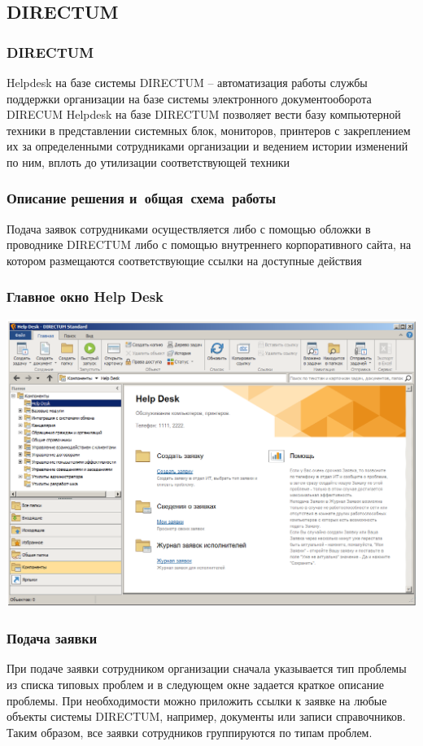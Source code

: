\documentclass{../industrial-development}
\begin{document}
\subsection{DIRECTUM}
\begin{frame} \frametitle{DIRECTUM}

    Helpdesk на базе системы DIRECTUM – автоматизация работы службы поддержки организации на базе системы электронного документооборота DIRECUM
    \newline
    \newline
    Helpdesk на базе DIRECTUM позволяет вести базу компьютерной техники в представлении системных блок, мониторов, принтеров с закреплением их за определенными сотрудниками организации и ведением истории изменений по ним, вплоть до утилизации соответствующей техники

\end{frame}
\lecturenotes

\begin{frame} \frametitle{Описание решения и~общая~схема~работы}
Подача заявок сотрудниками осуществляется либо с помощью обложки в проводнике DIRECTUM либо с помощью внутреннего корпоративного сайта, на котором размещаются соответствующие ссылки на доступные действия
\end{frame}
\lecturenotes

\begin{frame} \frametitle{Главное окно Help Desk}
\centerline{\includegraphics[width=\textwidth]{pic1.png}}
\end{frame}
\lecturenotes

\begin{frame} \frametitle{Подача заявки}
При подаче заявки сотрудником организации сначала указывается тип проблемы из списка типовых проблем и в следующем окне задается краткое описание проблемы. 
При необходимости можно приложить ссылки к заявке на любые объекты системы DIRECTUM, например, документы или записи справочников. Таким образом, все заявки сотрудников группируются по типам проблем.
\end{frame}
\lecturenotes
\end{document}
